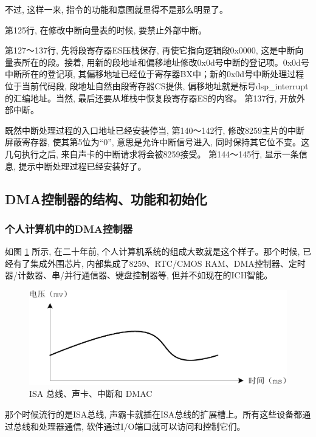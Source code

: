 \documentclass[12pt]{article}
\begin{document}
\begin{CJK}{UTF8}{gbsn}
不过, 这样一来, 指令的功能和意图就显得不是那么明显了。

第125行, 在修改中断向量表的时候, 要禁止外部中断。

第127～137行, 先将段寄存器ES压栈保存, 再使它指向逻辑段0x0000, 这是中断向量表所在的段。接着, 用新的段地址和偏移地址修改0x0d号中断的登记项。0x0d号中断所在的登记项, 其偏移地址已经位于寄存器BX中；新的0x0d号中断处理过程位于当前代码段, 段地址自然由段寄存器CS提供, 偏移地址就是标号dsp\_{}interrupt的汇编地址。当然, 最后还要从堆栈中恢复段寄存器ES的内容。
第137行, 开放外部中断。

既然中断处理过程的入口地址已经安装停当, 第140～142行, 修改8259主片的中断屏蔽寄存器, 使其第5位为“0”, 意思是允许中断信号进入, 同时保持其它位不变。这几句执行之后, 来自声卡的中断请求将会被8259接受。
第144～145行, 显示一条信息, 提示中断处理过程已经安装好了。

\subsection{DMA控制器的结构、功能和初始化}
\subsubsection{个人计算机中的DMA控制器}
如图 \ref{isa_bus} 所示, 在二十年前, 个人计算机系统的组成大致就是这个样子。那个时候, 已经有了集成外围芯片, 内部集成了8259、RTC/CMOS RAM、DMA控制器、定时器/计数器、串/并行通信器、键盘控制器等, 但并不如现在的ICH智能。
 
\begin{figure}
\begin{center}
\includegraphics[width=\textwidth]{eps/10-5.bmp.eps}
\caption{ISA 总线、声卡、中断和 DMAC}\label{isa_bus}
\end{center}
\end{figure}

那个时候流行的是ISA总线, 声霸卡就插在ISA总线的扩展槽上。所有这些设备都通过总线和处理器通信, 软件通过I/O端口就可以访问和控制它们。


\end{CJK}
\end{document}
